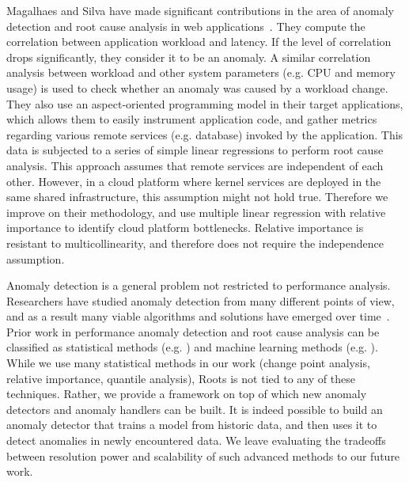 Magalhaes and Silva have made significant contributions in the area of anomaly detection
and root cause analysis in web applications~\cite{Magalhaes:2010:DPA:1906485.1906774, Magalhaes:2011:RAP:1982185.1982234}. 
They compute the correlation between application
workload and latency. If the level of correlation drops significantly, they consider it to be an
anomaly. A similar correlation analysis between workload and other system parameters 
(e.g. CPU and memory usage) is used to check whether an anomaly was caused by a workload
change. They also use an aspect-oriented programming model in their target applications, which
allows them to easily instrument application code, and gather metrics regarding various 
remote services (e.g. database) invoked by the application. This data is subjected to a 
series of simple linear regressions to perform root cause analysis. This approach assumes
that remote services are independent of each other. However, in a cloud platform where
kernel services are deployed in the same shared infrastructure, this assumption might not
hold true. Therefore we improve on their methodology, and use multiple linear regression
with relative importance to identify cloud platform bottlenecks. Relative importance
is resistant to multicollinearity, and therefore does not require the independence assumption.

Anomaly detection is a general problem not restricted to performance analysis. Researchers
have studied anomaly detection from many different points of view, and as a result many
viable algorithms and solutions have emerged over time~\cite{Chandola:2009:ADS:1541880.1541882}.
Prior work in performance anomaly detection and root cause analysis can be classified as statistical
methods (e.g. \cite{6311395,Malkowski:2007:BDU:1783374.1783389,Magalhaes:2011:RAP:1982185.1982234,Nguyen:2011:PPR:2038633.2038634}) 
and machine learning methods (e.g. \cite{Cohen:2004:CID:1251254.1251270,Yu:2013:SNA:2494621.2494643,bhaduri2011detecting}).
While we use many statistical methods
in our work (change point analysis, relative importance, quantile analysis), Roots is not tied to any of these
techniques. Rather, we provide a framework on top of which new anomaly detectors and anomaly
handlers can be built. It is indeed possible to build an anomaly detector that trains a model
from historic data, and then uses it to detect anomalies in newly encountered data. We
leave evaluating the tradeoffs between resolution power and scalability of such advanced
methods to our future work.